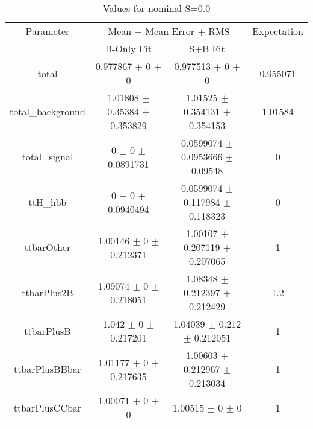 \begin{table}
\centering
\caption{Values for nominal S=0.0}
\begin{tabular}{cccc}
\toprule
Parameter & \multicolumn{2}{c}{Mean $\pm$ Mean Error $\pm$ RMS} & Expectation\\
 & B-Only Fit & S+B Fit & \\
\midrule
total & \num{0.977867} $\pm$ \num{0} $\pm$ \num{0} & \num{0.977513} $\pm$ \num{0} $\pm$ \num{0} & \num{0.955071}\\
total\_background & \num{1.01808} $\pm$ \num{0.35384} $\pm$ \num{0.353829} & \num{1.01525} $\pm$ \num{0.354131} $\pm$ \num{0.354153} & \num{1.01584}\\
total\_signal & \num{0} $\pm$ \num{0} $\pm$ \num{0.0891731} & \num{0.0599074} $\pm$ \num{0.0953666} $\pm$ \num{0.09548} & \num{0}\\
ttH\_hbb & \num{0} $\pm$ \num{0} $\pm$ \num{0.0940494} & \num{0.0599074} $\pm$ \num{0.117984} $\pm$ \num{0.118323} & \num{0}\\
ttbarOther & \num{1.00146} $\pm$ \num{0} $\pm$ \num{0.212371} & \num{1.00107} $\pm$ \num{0.207119} $\pm$ \num{0.207065} & \num{1}\\
ttbarPlus2B & \num{1.09074} $\pm$ \num{0} $\pm$ \num{0.218051} & \num{1.08348} $\pm$ \num{0.212397} $\pm$ \num{0.212429} & \num{1.2}\\
ttbarPlusB & \num{1.042} $\pm$ \num{0} $\pm$ \num{0.217201} & \num{1.04039} $\pm$ \num{0.212} $\pm$ \num{0.212051} & \num{1}\\
ttbarPlusBBbar & \num{1.01177} $\pm$ \num{0} $\pm$ \num{0.217635} & \num{1.00603} $\pm$ \num{0.212967} $\pm$ \num{0.213034} & \num{1}\\
ttbarPlusCCbar & \num{1.00071} $\pm$ \num{0} $\pm$ \num{0} & \num{1.00515} $\pm$ \num{0} $\pm$ \num{0} & \num{1}\\
\bottomrule
\end{tabular}
\end{table}